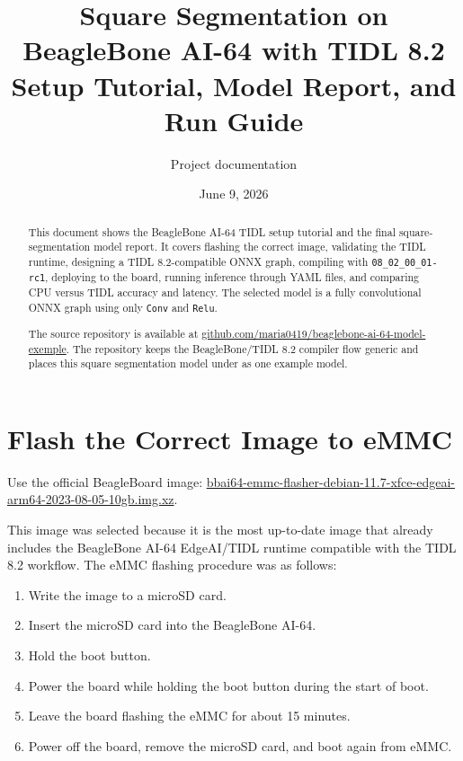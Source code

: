 \documentclass[11pt,a4paper]{article}
\title{Square Segmentation on BeagleBone AI-64 with TIDL 8.2\\Setup Tutorial, Model Report, and Run Guide}
\author{Project documentation}
\date{June 9, 2026}
\begin{document}
\maketitle

\tableofcontents
\newpage

\begin{abstract}
This document shows the BeagleBone AI-64 TIDL setup tutorial and the final square-segmentation model report.  It covers flashing the correct image, validating the TIDL runtime, designing a TIDL 8.2-compatible ONNX graph, compiling with \texttt{08\_02\_00\_01-rc1}, deploying to the board, running inference through YAML files, and comparing CPU versus TIDL accuracy and latency.  The selected model is a fully convolutional ONNX graph using only \texttt{Conv} and \texttt{Relu}.

The source repository is available at \href{https://github.com/maria0419/beaglebone-ai-64-model-exemple}{github.com/maria0419/beaglebone-ai-64-model-exemple}.  The repository keeps the BeagleBone/TIDL 8.2 compiler flow generic and places this square segmentation model under  as one example model.
\end{abstract}

\section{Flash the Correct Image to eMMC}

Use the official BeagleBoard image: \href{https://www.beagleboard.org/distros/bbai64-11-7-2023-09-02-10gb-emmc-ti-edgeai-xfce-flasher}{bbai64-emmc-flasher-debian-11.7-xfce-edgeai-arm64-2023-08-05-10gb.img.xz}.

This image was selected because it is the most up-to-date image that already includes the BeagleBone AI-64 EdgeAI/TIDL runtime compatible with the TIDL 8.2 workflow. The eMMC flashing procedure was as follows:

\begin{enumerate}
\item Write the image to a microSD card.
\item Insert the microSD card into the BeagleBone AI-64.
\item Hold the boot button.
\item Power the board while holding the boot button during the start of boot.
\item Leave the board flashing the eMMC for about 15 minutes.
\item Power off the board, remove the microSD card, and boot again from eMMC.
\end{enumerate}
\end{document}
